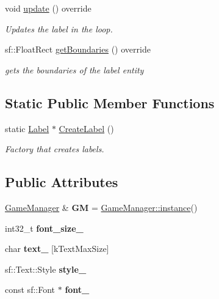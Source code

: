 \begin{DoxyCompactItemize}
void \hyperlink{class_label_adcd154f9e53d277c1b7a11bd058936a0}{update} () override
\begin{DoxyCompactList}\small\item\em Updates the label in the loop. \end{DoxyCompactList}\item 
sf\+::\+Float\+Rect \hyperlink{class_label_a3eb456d7295b3d5af615b3dc6e761f4b}{get\+Boundaries} () override
\begin{DoxyCompactList}\small\item\em gets the boundaries of the label entity \end{DoxyCompactList}\end{DoxyCompactItemize}
\subsection*{Static Public Member Functions}
\begin{DoxyCompactItemize}
\item 
static \hyperlink{class_label}{Label} $\ast$ \hyperlink{class_label_a9331db7ea12bb0bfa69910b9aa2229a4}{Create\+Label} ()
\begin{DoxyCompactList}\small\item\em Factory that creates labels. \end{DoxyCompactList}\end{DoxyCompactItemize}
\subsection*{Public Attributes}
\begin{DoxyCompactItemize}
\item 
\mbox{\label{class_label_a629484d96adf9bc8eab10e24cf5833d7}} 
\hyperlink{class_game_manager}{Game\+Manager} \& {\bfseries GM} = \hyperlink{class_game_manager_afa37ab23c040b5225d567d4c9ab854e1}{Game\+Manager\+::instance}()
\item 
\mbox{\label{class_label_a96bfd593e67f9031a244732fed63358f}} 
int32\+\_\+t {\bfseries font\+\_\+size\+\_\+}
\item 
\mbox{\label{class_label_a272e5426b0989b667b42cc4c87d697a7}} 
char {\bfseries text\+\_\+} \mbox{[}k\+Text\+Max\+Size\mbox{]}
\item 
\mbox{\label{class_label_a2f2da01fed83e50368d3d3674ed11d1b}} 
sf\+::\+Text\+::\+Style {\bfseries style\+\_\+}
\item 
\mbox{\label{class_label_a19110944dc9f96e238ca9e807d06421c}} 
const sf\+::\+Font $\ast$ {\bfseries font\+\_\+}
\end{DoxyCompactItemize}
